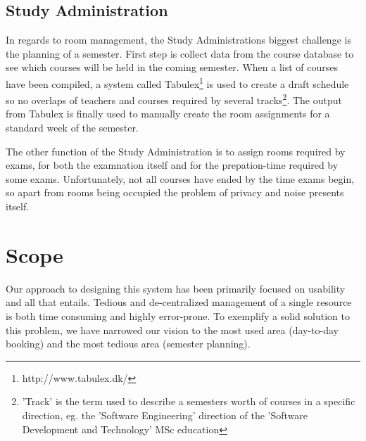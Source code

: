\subsection{Study Administration}
In regards to room management, the Study Administrations biggest challenge is the planning of a semester. First step is collect data from the course database to see which courses will be held in the coming semester. When a list of courses have been compiled, a system called Tabulex\footnote{http://www.tabulex.dk/} is used to create a draft schedule so no overlaps of teachers and courses required by several tracks\footnote{'Track' is the term used to describe a semesters worth of courses in a specific direction, eg. the 'Software Engineering' direction of the 'Software Development and Technology' MSc education}. The output from Tabulex is finally used to manually create the room assignments for a standard week of the semester.

The other function of the Study Administration is to assign rooms required by exams, for both the examnation itself and for the prepation-time required by some exams. Unfortunately, not all courses have ended by the time exams begin, so apart from rooms being occupied the problem of privacy and noise presents itself.
\section{Scope}
Our approach to designing this system has been primarily focused on usability and all that entails. Tedious and de-centralized management of a single resource is both time consuming and highly error-prone.
To exemplify a solid solution to this problem, we have narrowed our vision to the most used area (day-to-day booking) and the most tedious area (semester planning).

